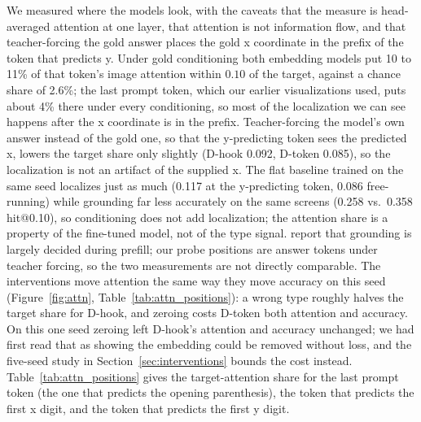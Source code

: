 \documentclass{article}
\makeatletter
\newcommand{\hitat}[1]{hit@#1}
\makeatother
\begin{document}
We measured where the models look, with the caveats that the measure is head-averaged attention at one layer, that attention is not information flow, and that teacher-forcing the gold answer places the gold x coordinate in the prefix of the token that predicts y. Under gold conditioning both embedding models put 10 to 11\% of that token's image attention within $0.10$ of the target, against a chance share of 2.6\%; the last prompt token, which our earlier visualizations used, puts about 4\% there under every conditioning, so most of the localization we can see happens after the x coordinate is in the prefix. Teacher-forcing the model's own answer instead of the gold one, so that the y-predicting token sees the predicted x, lowers the target share only slightly (D-hook 0.092, D-token 0.085), so the localization is not an artifact of the supplied x. The flat baseline trained on the same seed localizes just as much (0.117 at the y-predicting token, 0.086 free-running) while grounding far less accurately on the same screens (0.258 vs.\ 0.358 \hitat{0.10}), so conditioning does not add localization; the attention share is a property of the fine-tuned model, not of the type signal. \citet{prefill} report that grounding is largely decided during prefill; our probe positions are answer tokens under teacher forcing, so the two measurements are not directly comparable. The interventions move attention the same way they move accuracy on this seed (Figure~\ref{fig:attn}, Table~\ref{tab:attn_positions}): a wrong type roughly halves the target share for D-hook, and zeroing costs D-token both attention and accuracy. On this one seed zeroing left D-hook's attention and accuracy unchanged; we had first read that as showing the embedding could be removed without loss, and the five-seed study in Section~\ref{sec:interventions} bounds the cost instead. Table~\ref{tab:attn_positions} gives the target-attention share for the last prompt token (the one that predicts the opening parenthesis), the token that predicts the first x digit, and the token that predicts the first y digit.
\end{document}
